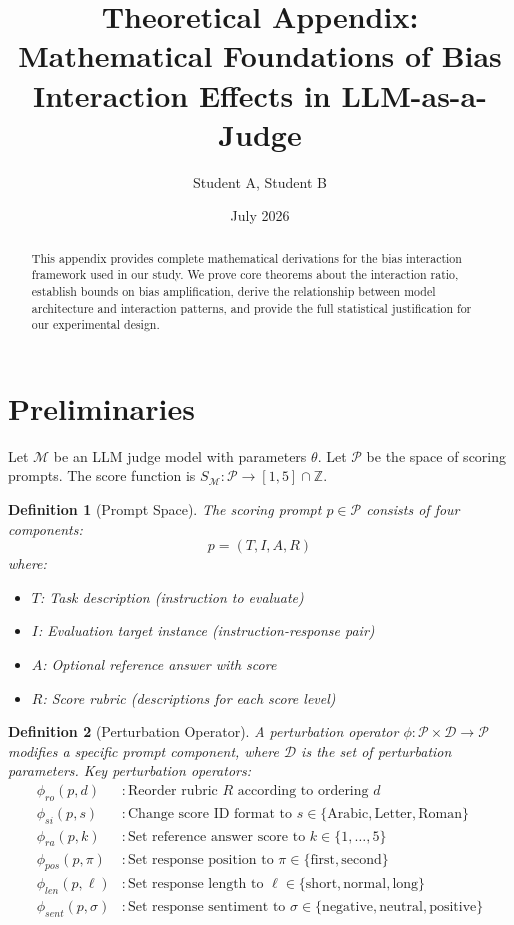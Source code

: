 \documentclass[11pt]{article}
\title{Theoretical Appendix:\\Mathematical Foundations of Bias Interaction Effects in LLM-as-a-Judge}
\author{Student A, Student B}
\date{July 2026}
\newtheorem{definition}{Definition}
\begin{document}
\maketitle

\begin{abstract}
This appendix provides complete mathematical derivations for the bias interaction framework used in our study. We prove core theorems about the interaction ratio, establish bounds on bias amplification, derive the relationship between model architecture and interaction patterns, and provide the full statistical justification for our experimental design.
\end{abstract}

\section{Preliminaries}

Let $\mathcal{M}$ be an LLM judge model with parameters $\theta$. Let $\mathcal{P}$ be the space of scoring prompts. The score function is $S_\mathcal{M}: \mathcal{P} \rightarrow [1,5] \cap \mathbb{Z}$.

\begin{definition}[Prompt Space]
The scoring prompt $p \in \mathcal{P}$ consists of four components:
\begin{equation}
p = (T, I, A, R)
\end{equation}
where:
\begin{itemize}
    \item $T$: Task description (instruction to evaluate)
    \item $I$: Evaluation target instance (instruction-response pair)
    \item $A$: Optional reference answer with score
    \item $R$: Score rubric (descriptions for each score level)
\end{itemize}
\end{definition}

\begin{definition}[Perturbation Operator]
A perturbation operator $\phi: \mathcal{P} \times \mathcal{D} \rightarrow \mathcal{P}$ modifies a specific prompt component, where $\mathcal{D}$ is the set of perturbation parameters. Key perturbation operators:
\begin{align}
\phi_{ro}(p, d) &: \text{Reorder rubric } R \text{ according to ordering } d \\
\phi_{si}(p, s) &: \text{Change score ID format to } s \in \{\text{Arabic}, \text{Letter}, \text{Roman}\} \\
\phi_{ra}(p, k) &: \text{Set reference answer score to } k \in \{1,\dots,5\} \\
\phi_{pos}(p, \pi) &: \text{Set response position to } \pi \in \{\text{first}, \text{second}\} \\
\phi_{len}(p, \ell) &: \text{Set response length to } \ell \in \{\text{short}, \text{normal}, \text{long}\} \\
\phi_{sent}(p, \sigma) &: \text{Set response sentiment to } \sigma \in \{\text{negative}, \text{neutral}, \text{positive}\}
\end{align}
\end{definition}
\end{document}
